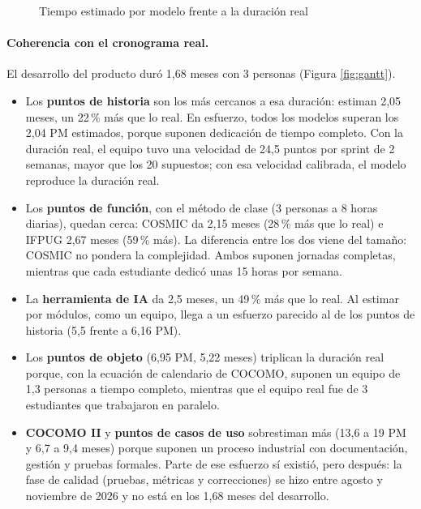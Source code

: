 \begin{figure}[H]
\centering
\caption{Tiempo estimado por modelo frente a la duración real}
\label{fig:estimacion-barras}
\end{figure}

\paragraph{Coherencia con el cronograma real.} El desarrollo del producto duró 1,68 meses con 3 personas (Figura \ref{fig:gantt}).
\begin{itemize}
  \item Los \textbf{puntos de historia} son los más cercanos a esa duración: estiman 2,05 meses, un 22\,\% más que lo real. En esfuerzo, todos los modelos superan los 2,04 PM estimados, porque suponen dedicación de tiempo completo. Con la duración real, el equipo tuvo una velocidad de 24,5 puntos por sprint de 2 semanas, mayor que los 20 supuestos; con esa velocidad calibrada, el modelo reproduce la duración real.
  \item Los \textbf{puntos de función}, con el método de clase (3 personas a 8 horas diarias), quedan cerca: COSMIC da 2,15 meses (28\,\% más que lo real) e IFPUG 2,67 meses (59\,\% más). La diferencia entre los dos viene del tamaño: COSMIC no pondera la complejidad. Ambos suponen jornadas completas, mientras que cada estudiante dedicó unas 15 horas por semana.
  \item La \textbf{herramienta de IA} da 2,5 meses, un 49\,\% más que lo real. Al estimar por módulos, como un equipo, llega a un esfuerzo parecido al de los puntos de historia (5,5 frente a 6,16 PM).
  \item Los \textbf{puntos de objeto} (6,95 PM, 5,22 meses) triplican la duración real porque, con la ecuación de calendario de COCOMO, suponen un equipo de 1,3 personas a tiempo completo, mientras que el equipo real fue de 3 estudiantes que trabajaron en paralelo.
  \item \textbf{COCOMO II} y \textbf{puntos de casos de uso} sobrestiman más (13,6 a 19 PM y 6,7 a 9,4 meses) porque suponen un proceso industrial con documentación, gestión y pruebas formales. Parte de ese esfuerzo sí existió, pero después: la fase de calidad (pruebas, métricas y correcciones) se hizo entre agosto y noviembre de 2026 y no está en los 1,68 meses del desarrollo.
\end{itemize}

